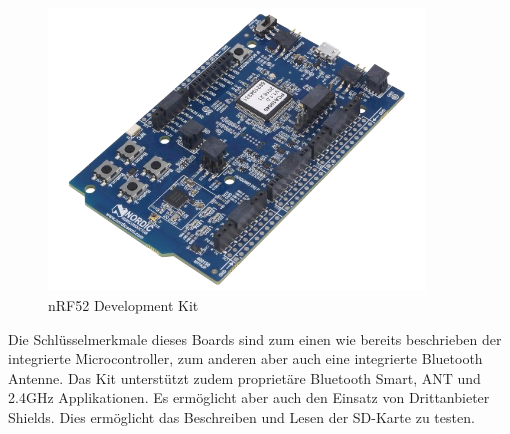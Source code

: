\begin{figure}[H]
	\begin{center}
		\includegraphics[width=100mm]{data/NRF52-DK.png}
		\caption[nRF52 Development Kit]{nRF52 Development Kit \cite{nRF52-DK}} %
		\label{fig:nRF52832-DK}
	\end{center}
\end{figure}
 Die Schlüsselmerkmale dieses Boards sind zum einen wie bereits beschrieben der integrierte Microcontroller, zum anderen aber auch eine integrierte Bluetooth Antenne. Das Kit unterstützt zudem proprietäre Bluetooth Smart, ANT und 2.4GHz Applikationen. Es ermöglicht aber auch den Einsatz von Drittanbieter Shields. Dies ermöglicht das Beschreiben und Lesen der SD-Karte zu testen.

